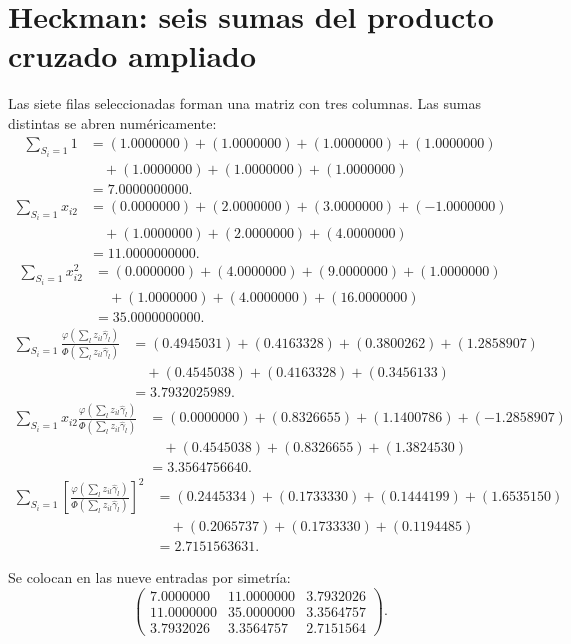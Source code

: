 \documentclass[11pt,a4paper]{article}
\begin{document}
\section{Heckman: seis sumas del producto cruzado ampliado}\label{unidad161}
Las siete filas seleccionadas
forman una matriz con
tres columnas.
Las sumas distintas se
abren numéricamente:
\[
\begin{aligned}
\sum_{S_i=1}1&=(1.0000000)+(1.0000000)+(1.0000000)+(1.0000000)\\&\quad+(1.0000000)+(1.0000000)+(1.0000000)\\&=7.0000000000.\end{aligned}
\]
\[
\begin{aligned}
\sum_{S_i=1}x_{i2}&=(0.0000000)+(2.0000000)+(3.0000000)+(-1.0000000)\\&\quad+(1.0000000)+(2.0000000)+(4.0000000)\\&=11.0000000000.\end{aligned}
\]
\[
\begin{aligned}
\sum_{S_i=1}x_{i2}^2&=(0.0000000)+(4.0000000)+(9.0000000)+(1.0000000)\\&\quad+(1.0000000)+(4.0000000)+(16.0000000)\\&=35.0000000000.\end{aligned}
\]
\[
\begin{aligned}
\sum_{S_i=1}\frac{\varphi(\sum_lz_{il}\widehat\gamma_l)}{\Phi(\sum_lz_{il}\widehat\gamma_l)}&=(0.4945031)+(0.4163328)+(0.3800262)+(1.2858907)\\&\quad+(0.4545038)+(0.4163328)+(0.3456133)\\&=3.7932025989.\end{aligned}
\]
\[
\begin{aligned}
\sum_{S_i=1}x_{i2}\frac{\varphi(\sum_lz_{il}\widehat\gamma_l)}{\Phi(\sum_lz_{il}\widehat\gamma_l)}&=(0.0000000)+(0.8326655)+(1.1400786)+(-1.2858907)\\&\quad+(0.4545038)+(0.8326655)+(1.3824530)\\&=3.3564756640.\end{aligned}
\]
\[
\begin{aligned}
\sum_{S_i=1}\left[\frac{\varphi(\sum_lz_{il}\widehat\gamma_l)}{\Phi(\sum_lz_{il}\widehat\gamma_l)}\right]^2&=(0.2445334)+(0.1733330)+(0.1444199)+(1.6535150)\\&\quad+(0.2065737)+(0.1733330)+(0.1194485)\\&=2.7151563631.\end{aligned}
\]

Se colocan en las
nueve entradas por simetría:
\[
\begin{pmatrix}7.0000000&11.0000000&3.7932026\\11.0000000&35.0000000&3.3564757\\3.7932026&3.3564757&2.7151564\end{pmatrix}.
\]
\end{document}
